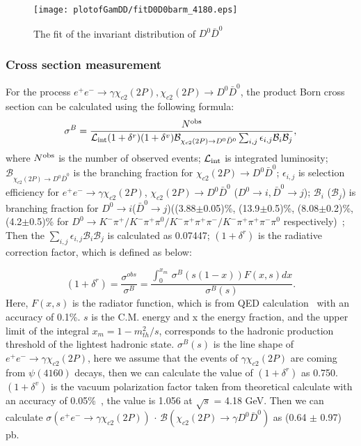 \documentclass[aps,preprint,tightenlines,superscriptaddress,showpacs,byrevtex,amsmath,amssymb,nofloatfix]{revtex4}
\begin{document}
\begin{figure}[!htbp]
\captionsetup{justification=raggedright}
    \texttt{[image: plotofGamDD/fitD0D0barm\_4180.eps]}

  \caption{\small The fit of the invariant distribution of $D^{0}\bar{D}^{0}$}
  \label{fitmDDbar_D0_4180}
\end{figure}


\subsubsection{Cross section measurement}
For the process $e^{+}e^{-} \rightarrow \gamma \chi_{c2}(2P), \chi_{c2}(2P) \to D^{0}\bar{D}^{0}$, the product Born cross section can be calculated using the following formula:
\begin{equation}
  \sigma^{B} = \frac{N^{\rm obs}}{\mathcal{L}_{\rm int} (1+\delta^{r}) (1+\delta^{v}) \mathcal{B}_{\chi_{c2}(2P)\rightarrow D^{0}\bar D^{0}} \sum_{i,j}\epsilon_{i,j} \mathcal{B}_{i}\mathcal{B}_{j}},
\end{equation}
where $N^{\rm obs}$ is the number of observed events; $\mathcal{L}_{\rm int}$ is integrated luminosity; $\mathcal{B}_{\chi_{c2}(2P)\rightarrow D^{0}\bar{D}^{0}}$ is the branching fraction for $\chi_{c2}(2P) \rightarrow D^{0}\bar{D}^{0}$;  $\epsilon_{i,j}$ is selection efficiency for $e^{+}e^{-} \rightarrow  \gamma \chi_{c2} (2P)$, $\chi_{c2} (2P) \rightarrow D^{0}\bar{D}^{0}$ ($D^{0}\rightarrow i, \bar{D}^{0}\rightarrow j$); $\mathcal{B}_{i}$ ($\mathcal{B}_{j}$) is branching fraction for $D^{0}\rightarrow i$($\bar{D}^{0}\rightarrow j$)((3.88$\pm$0.05)\%, (13.9$\pm$0.5)\%, (8.08$\pm$0.2)\%, (4.2$\pm$0.5)\% for $D^{0} \rightarrow K^{-}\pi^{+}/K^{-}\pi^{+}\pi^{0}/K^{-}\pi^{+}\pi^{+}\pi^{-}/K^{-}\pi^{+}\pi^{+}\pi^{-}\pi^{0}$ respectively)~\cite{PDG}; Then the $\sum_{i,j}\epsilon_{i,j} \mathcal{B}_{i}\mathcal{B}_{j}$ is calculated as 0.07447; $(1+\delta^{r})$ is the radiative correction factor, which is defined as below:

\begin{equation}
    (1+\delta^{r})= \frac{\sigma^{obs}}{\sigma^{B}} = \frac{\int_{0}^{x_{m}} \,\sigma^{B}(s(1-x))F(x,s)d x}{\sigma^{B}(s)}.
\end{equation}
Here, $F(x,s)$ is the radiator function, which is from QED calculation~\cite{QEDcalculation} with an accuracy of 0.1\%. $s$ is the C.M. energy and x the energy fraction, and the upper limit of the integral $x_{m} = 1-m^{2}_{th}/s$, corresponds to the hadronic production threshold of the lightest hadronic state. $\sigma^{B}(s)$ is the line shape of  $e^{+}e^{-}\rightarrow \gamma \chi_{c2} (2P)$, here we assume that the events of $\gamma \chi_{c2} (2P)$  are coming from $\psi(4160)$ decays, then we can calculate the value of  $(1+\delta^{r})$ as 0.750. $(1+\delta^{v})$ is the vacuum polarization factor taken from theoretical calculate with an accuracy of 0.05\%~\cite{vpcalculation}, the value is 1.056 at $\sqrt{s}$ = 4.18 GeV. Then we can calculate $\sigma (e^{+}e^{-}\rightarrow \gamma \chi_{c2} (2P))$ $\cdot$ $\mathcal{B}(\chi_{c2} (2P)\rightarrow \gamma D^{0}\bar{D}^{0})$ as (0.64 $\pm$ 0.97) pb.
\end{document}
